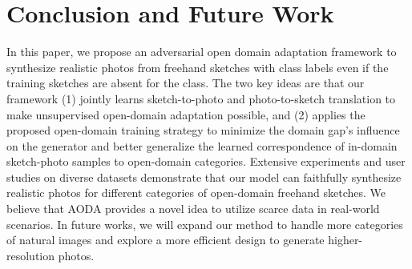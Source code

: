 \documentclass[10pt,twocolumn,letterpaper]{article}
\begin{document}
\section{Conclusion and Future Work}
In this paper, we propose an adversarial open domain adaptation framework to synthesize realistic photos from freehand sketches with class labels even if the training sketches are absent for the class. The two key ideas are that our framework (1) jointly learns sketch-to-photo and photo-to-sketch translation to make unsupervised open-domain adaptation  possible, and (2) applies the proposed open-domain training strategy to minimize the domain gap's influence on the generator and better generalize the learned correspondence of in-domain sketch-photo samples to open-domain categories. Extensive experiments and user studies on diverse datasets demonstrate that our model can faithfully synthesize realistic photos for different categories of open-domain freehand sketches. We believe that AODA provides a novel idea to utilize scarce data in real-world scenarios. In future works, we will expand our method to handle more categories of natural images and explore a more efficient design to generate higher-resolution photos. 





\clearpage
\pagebreak









\appendix
\end{document}

